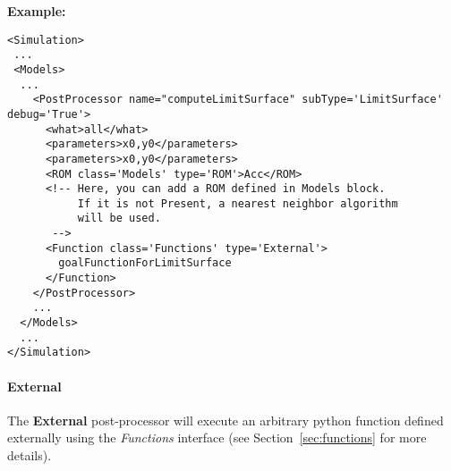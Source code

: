 \textbf{Example:}
\begin{lstlisting}[style=XML,morekeywords={name,subType,debug,class,type}]
<Simulation>
 ...
 <Models>
  ...
    <PostProcessor name="computeLimitSurface" subType='LimitSurface' debug='True'>
      <what>all</what>
      <parameters>x0,y0</parameters>
      <parameters>x0,y0</parameters>
      <ROM class='Models' type='ROM'>Acc</ROM>
      <!-- Here, you can add a ROM defined in Models block. 
           If it is not Present, a nearest neighbor algorithm
           will be used.
       -->
      <Function class='Functions' type='External'>
        goalFunctionForLimitSurface
      </Function>
    </PostProcessor>
    ...
  </Models>
  ...
</Simulation>
\end{lstlisting}
\paragraph{External}
\label{External}
The \textbf{External} post-processor will execute an arbitrary python function
defined externally using the \textit{Functions} interface (see 
Section~\ref{sec:functions} for more details).
%


